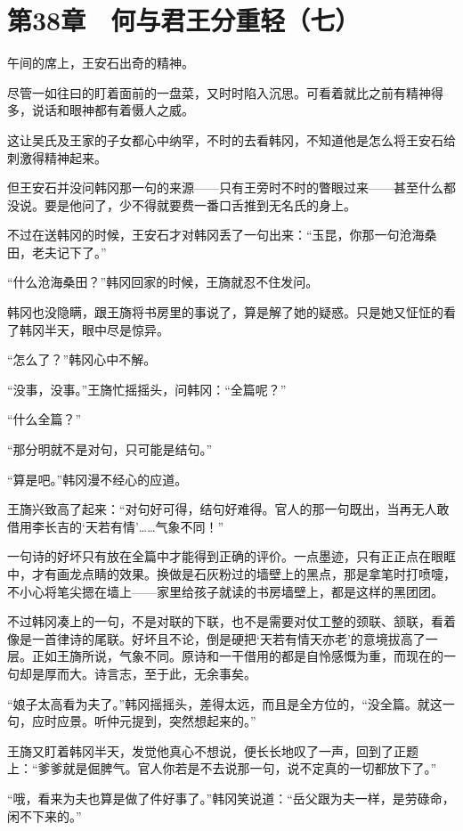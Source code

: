 \section{第38章　何与君王分重轻（七）}

午间的席上，王安石出奇的精神。

尽管一如往曰的盯着面前的一盘菜，又时时陷入沉思。可看着就比之前有精神得多，说话和眼神都有着慑人之威。

这让吴氏及王家的子女都心中纳罕，不时的去看韩冈，不知道他是怎么将王安石给刺激得精神起来。

但王安石并没问韩冈那一句的来源——只有王旁时不时的瞥眼过来——甚至什么都没说。要是他问了，少不得就要费一番口舌推到无名氏的身上。

不过在送韩冈的时候，王安石才对韩冈丢了一句出来：“玉昆，你那一句沧海桑田，老夫记下了。”

“什么沧海桑田？”韩冈回家的时候，王旖就忍不住发问。

韩冈也没隐瞒，跟王旖将书房里的事说了，算是解了她的疑惑。只是她又怔怔的看了韩冈半天，眼中尽是惊异。

“怎么了？”韩冈心中不解。

“没事，没事。”王旖忙摇摇头，问韩冈：“全篇呢？”

“什么全篇？”

“那分明就不是对句，只可能是结句。”

“算是吧。”韩冈漫不经心的应道。

王旖兴致高了起来：“对句好可得，结句好难得。官人的那一句既出，当再无人敢借用李长吉的‘天若有情’……气象不同！”

一句诗的好坏只有放在全篇中才能得到正确的评价。一点墨迹，只有正正点在眼眶中，才有画龙点睛的效果。换做是石灰粉过的墙壁上的黑点，那是拿笔时打喷嚏，不小心将笔尖摁在墙上——家里给孩子就读的书房墙壁上，都是这样的黑团团。

不过韩冈凑上的一句，不是对联的下联，也不是需要对仗工整的颈联、颔联，看着像是一首律诗的尾联。好坏且不论，倒是硬把‘天若有情天亦老’的意境拔高了一层。正如王旖所说，气象不同。原诗和一干借用的都是自怜感慨为重，而现在的一句却是厚而大。诗言志，至于此，无余事矣。

“娘子太高看为夫了。”韩冈摇摇头，差得太远，而且是全方位的，“没全篇。就这一句，应时应景。听仲元提到，突然想起来的。”

王旖又盯着韩冈半天，发觉他真心不想说，便长长地叹了一声，回到了正题上：“爹爹就是倔脾气。官人你若是不去说那一句，说不定真的一切都放下了。”

“哦，看来为夫也算是做了件好事了。”韩冈笑说道：“岳父跟为夫一样，是劳碌命，闲不下来的。”

